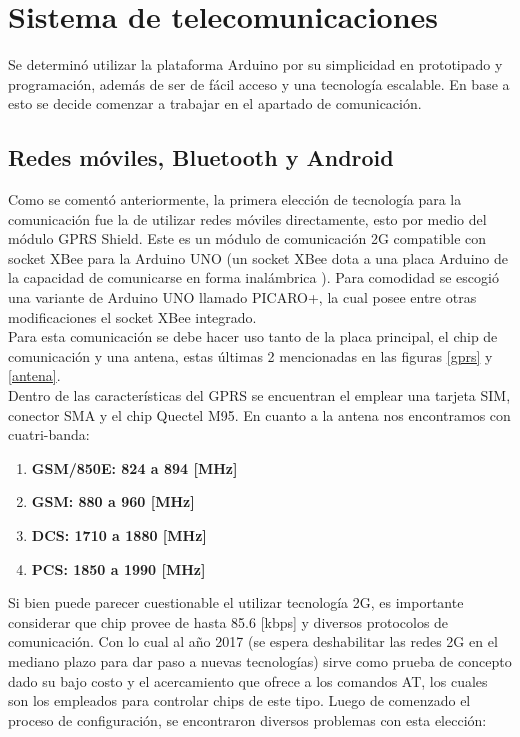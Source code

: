 \chapter{Sistema de telecomunicaciones}\label{comunicacion}
Se determinó utilizar la plataforma Arduino por su simplicidad en prototipado y programación, además de ser de fácil acceso y una tecnología escalable. En base a esto se decide comenzar a trabajar en el apartado de comunicación.
\section{Redes móviles, Bluetooth y Android}
Como se comentó anteriormente, la primera elección de tecnología para la comunicación fue la de utilizar redes móviles directamente, esto por medio del módulo GPRS Shield. Este es un módulo de comunicación 2G compatible con socket XBee para la Arduino UNO (un socket XBee dota a una placa Arduino de la capacidad de comunicarse en forma inalámbrica \cite{xbee_info}). Para comodidad se escogió una variante de Arduino UNO llamado PICARO+, la cual posee entre otras modificaciones el socket XBee integrado.\\
Para esta comunicación se debe hacer uso tanto de la placa principal, el chip de comunicación y una antena, estas últimas 2 mencionadas en las figuras \ref{gprs} y \ref{antena}.\\
Dentro de las características del GPRS se encuentran el emplear una tarjeta SIM, conector SMA y el chip Quectel M95. En cuanto a la antena nos encontramos con cuatri-banda: 
\begin{enumerate}
	\item\textbf{GSM/850E: 824 a 894 [MHz]}
	\item\textbf{GSM: 880 a 960 [MHz]}
	\item\textbf{DCS: 1710 a 1880 [MHz]}
	\item\textbf{PCS: 1850 a 1990 [MHz]}
\end{enumerate}

\newpage
Si bien puede parecer cuestionable el utilizar tecnología 2G, es importante considerar que chip provee de hasta 85.6 [kbps] y diversos protocolos de comunicación. Con lo cual al año 2017 (se espera deshabilitar las redes 2G en el mediano plazo para dar paso a nuevas tecnologías) sirve como prueba de concepto dado su bajo costo y el acercamiento que ofrece a los comandos AT, los cuales son los empleados para controlar chips de este tipo.
Luego de comenzado el proceso de configuración, se encontraron diversos problemas con esta elección:

